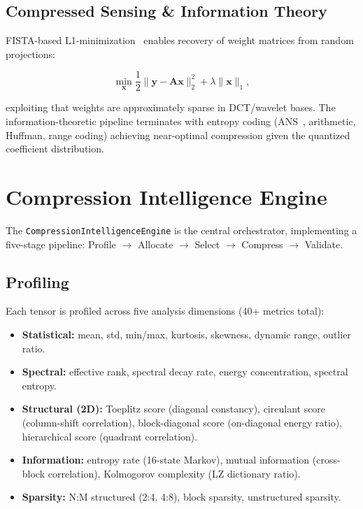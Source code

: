 \documentclass[11pt,a4paper,twocolumn]{article}
\begin{document}
\subsection{Compressed Sensing \& Information Theory}
\label{sec:sensing}

FISTA-based L1-minimization~\cite{beck2009fista} enables recovery of weight matrices from random projections:

\begin{equation}
	\label{eq:fista}
	\min_{\mathbf{x}} \frac{1}{2}\|\mathbf{y} - \mathbf{A}\mathbf{x}\|_2^2 + \lambda\|\mathbf{x}\|_1,
\end{equation}

exploiting that weights are approximately sparse in DCT/wavelet bases. The information-theoretic pipeline terminates with entropy coding (ANS~\cite{duda2015asymmetric}, arithmetic, Huffman, range coding) achieving near-optimal compression given the quantized coefficient distribution.

\section{Compression Intelligence Engine}
\label{sec:engine}

The \texttt{CompressionIntelligenceEngine} is the central orchestrator, implementing a five-stage pipeline: Profile $\to$ Allocate $\to$ Select $\to$ Compress $\to$ Validate.

\subsection{Profiling}
\label{sec:profiling}

Each tensor is profiled across five analysis dimensions (40+ metrics total):

\begin{itemize}
	\item \textbf{Statistical:} mean, std, min/max, kurtosis, skewness, dynamic range, outlier ratio.
	\item \textbf{Spectral:} effective rank, spectral decay rate, energy concentration, spectral entropy.
	\item \textbf{Structural (2D):} Toeplitz score (diagonal constancy), circulant score (column-shift correlation), block-diagonal score (on-diagonal energy ratio), hierarchical score (quadrant correlation).
	\item \textbf{Information:} entropy rate (16-state Markov), mutual information (cross-block correlation), Kolmogorov complexity (LZ dictionary ratio).
	\item \textbf{Sparsity:} N:M structured (2:4, 4:8), block sparsity, unstructured sparsity.
\end{itemize}
\end{document}
